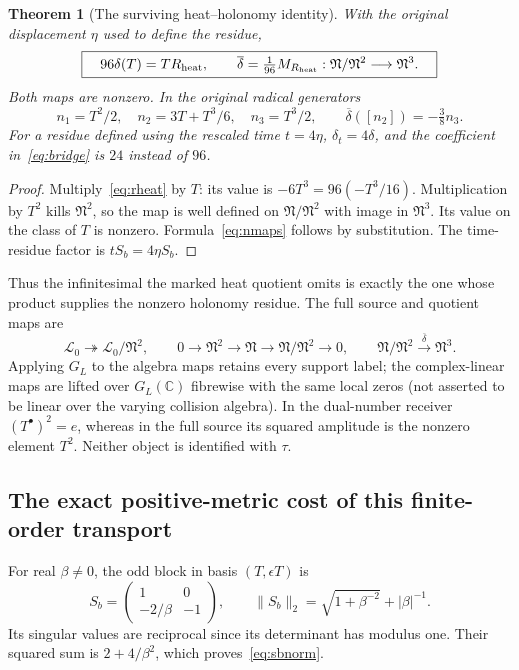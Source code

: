 \documentclass[11pt,a4paper]{article}
\newtheorem{theorem}{Theorem}[section]\newtheorem{proposition}[theorem]{Proposition}\newtheorem{lemma}[theorem]{Lemma}\newtheorem{corollary}[theorem]{Corollary}
\theoremstyle{definition}\newtheorem{definition}[theorem]{Definition}\newtheorem{remark}[theorem]{Remark}
\newcommand{\C}{\mathbb C}\newcommand{\R}{\mathbb R}\newcommand{\Z}{\mathbb Z}\newcommand{\B}{\mathbb B}
\begin{document}
\begin{theorem}[The surviving heat--holonomy identity]
With the original displacement $\eta$ used to define the residue,
\begin{equation}
 \boxed{\quad96\delta(T)=T R_{\rm heat},\qquad
 \overline\delta=\tfrac1{96}M_{R_{\rm heat}}:
 \mathfrak N/\mathfrak N^2\longrightarrow\mathfrak N^3.\quad}
                                                        \label{eq:bridge}
\end{equation}
Both maps are nonzero. In the original radical generators
\begin{equation}
 n_1=T^2/2,\quad n_2=3T+T^3/6,\quad n_3=T^3/2,
 \qquad\overline\delta([n_2])=-\tfrac38n_3.              \label{eq:nmaps}
\end{equation}
For a residue defined using the rescaled time $t=4\eta$, $\delta_t=4\delta$, and the coefficient in~\eqref{eq:bridge} is $24$ instead of $96$.
\end{theorem}
\begin{proof}
Multiply~\eqref{eq:rheat} by $T$: its value is $-6T^3=96(-T^3/16)$. Multiplication by $T^2$ kills $\mathfrak N^2$, so the map is well defined on $\mathfrak N/\mathfrak N^2$ with image in $\mathfrak N^3$. Its value on the class of $T$ is nonzero. Formula~\eqref{eq:nmaps} follows by substitution. The time-residue factor is $tS_b=4\eta S_b$.
\end{proof}
Thus the infinitesimal the marked heat quotient omits is exactly the one whose product supplies the nonzero holonomy residue. The full source and quotient maps are
\[
 \mathscr L_0\twoheadrightarrow\mathscr L_0/\mathfrak N^2,
 \qquad
 0\to\mathfrak N^2\to\mathfrak N\to\mathfrak N/\mathfrak N^2\to0,
 \qquad \mathfrak N/\mathfrak N^2\xrightarrow{\overline\delta}\mathfrak N^3.
\]
Applying $G_L$ to the algebra maps retains every support label; the complex-linear maps are lifted over $G_L(\C)$ fibrewise with the same local zeros (not asserted to be linear over the varying collision algebra). In the dual-number receiver $(T^\bullet)^2=e$, whereas in the full source its squared amplitude is the nonzero element $T^2$. Neither object is identified with $\tau$.

\subsection{The exact positive-metric cost of this finite-order transport}
For real $\beta\ne0$, the odd block in basis $(T,\epsilon T)$ is
\begin{equation}
 S_b=\begin{pmatrix}1&0\\-2/\beta&-1\end{pmatrix},\qquad
 \|S_b\|_2=\sqrt{1+\beta^{-2}}+|\beta|^{-1}.              \label{eq:sbnorm}
\end{equation}
Its singular values are reciprocal since its determinant has modulus one. Their squared sum is $2+4/\beta^2$, which proves~\eqref{eq:sbnorm}.
\end{document}
